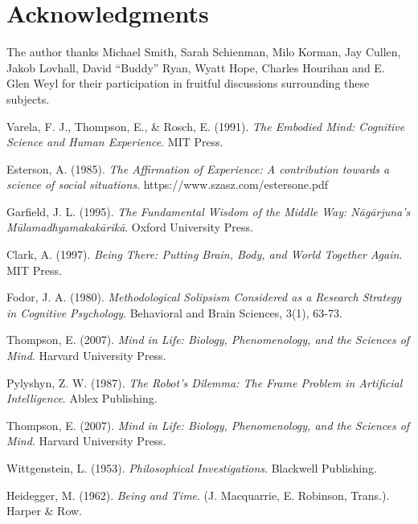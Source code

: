 \documentclass{article}
\begin{document}
\section*{Acknowledgments}

The author thanks Michael Smith, Sarah Schienman, Milo Korman, Jay Cullen, Jakob Lovhall, David ``Buddy'' Ryan, Wyatt Hope, Charles Hourihan and E. Glen Weyl for their participation in fruitful discussions surrounding these subjects.

\begin{thebibliography}{9}

    Varela, F. J., Thompson, E., \& Rosch, E. (1991). \textit{The Embodied Mind: Cognitive Science and Human Experience}. MIT Press.

    Esterson, A. (1985). \textit{The Affirmation of Experience: A contribution towards a science of social situations}. https://www.szasz.com/estersone.pdf

    Garfield, J. L. (1995). \textit{The Fundamental Wisdom of the Middle Way: Nāgārjuna's Mūlamadhyamakakārikā}. Oxford University Press.

     Clark, A. (1997). \textit{Being There: Putting Brain, Body, and World Together Again}. MIT Press.

     Fodor, J. A. (1980). \textit{Methodological Solipsism Considered as a Research Strategy in Cognitive Psychology}. Behavioral and Brain Sciences, 3(1), 63-73.

     Thompson, E. (2007). \textit{Mind in Life: Biology, Phenomenology, and the Sciences of Mind}. Harvard University Press.

     Pylyshyn, Z. W. (1987). \textit{The Robot's Dilemma: The Frame Problem in Artificial Intelligence}. Ablex Publishing.

     Thompson, E. (2007). \textit{Mind in Life: Biology, Phenomenology, and the Sciences of Mind}. Harvard University Press.

     Wittgenstein, L. (1953). \textit{Philosophical Investigations}. Blackwell Publishing.

     Heidegger, M. (1962). \textit{Being and Time}. (J. Macquarrie, E. Robinson, Trans.). Harper \& Row.

\end{thebibliography}
\end{document}
